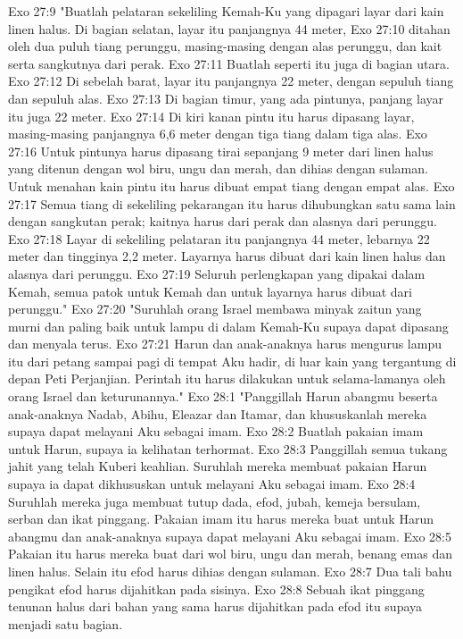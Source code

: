 Exo 27:9  "Buatlah pelataran sekeliling Kemah-Ku yang dipagari layar dari kain linen halus. Di bagian selatan, layar itu panjangnya 44 meter,
Exo 27:10  ditahan oleh dua puluh tiang perunggu, masing-masing dengan alas perunggu, dan kait serta sangkutnya dari perak.
Exo 27:11  Buatlah seperti itu juga di bagian utara.
Exo 27:12  Di sebelah barat, layar itu panjangnya 22 meter, dengan sepuluh tiang dan sepuluh alas.
Exo 27:13  Di bagian timur, yang ada pintunya, panjang layar itu juga 22 meter.
Exo 27:14  Di kiri kanan pintu itu harus dipasang layar, masing-masing panjangnya 6,6 meter dengan tiga tiang dalam tiga alas.
Exo 27:16  Untuk pintunya harus dipasang tirai sepanjang 9 meter dari linen halus yang ditenun dengan wol biru, ungu dan merah, dan dihias dengan sulaman. Untuk menahan kain pintu itu harus dibuat empat tiang dengan empat alas.
Exo 27:17  Semua tiang di sekeliling pekarangan itu harus dihubungkan satu sama lain dengan sangkutan perak; kaitnya harus dari perak dan alasnya dari perunggu.
Exo 27:18  Layar di sekeliling pelataran itu panjangnya 44 meter, lebarnya 22 meter dan tingginya 2,2 meter. Layarnya harus dibuat dari kain linen halus dan alasnya dari perunggu.
Exo 27:19  Seluruh perlengkapan yang dipakai dalam Kemah, semua patok untuk Kemah dan untuk layarnya harus dibuat dari perunggu."
Exo 27:20  "Suruhlah orang Israel membawa minyak zaitun yang murni dan paling baik untuk lampu di dalam Kemah-Ku supaya dapat dipasang dan menyala terus.
Exo 27:21  Harun dan anak-anaknya harus mengurus lampu itu dari petang sampai pagi di tempat Aku hadir, di luar kain yang tergantung di depan Peti Perjanjian. Perintah itu harus dilakukan untuk selama-lamanya oleh orang Israel dan keturunannya."
Exo 28:1  "Panggillah Harun abangmu beserta anak-anaknya Nadab, Abihu, Eleazar dan Itamar, dan khususkanlah mereka supaya dapat melayani Aku sebagai imam.
Exo 28:2  Buatlah pakaian imam untuk Harun, supaya ia kelihatan terhormat.
Exo 28:3  Panggillah semua tukang jahit yang telah Kuberi keahlian. Suruhlah mereka membuat pakaian Harun supaya ia dapat dikhususkan untuk melayani Aku sebagai imam.
Exo 28:4  Suruhlah mereka juga membuat tutup dada, efod, jubah, kemeja bersulam, serban dan ikat pinggang. Pakaian imam itu harus mereka buat untuk Harun abangmu dan anak-anaknya supaya dapat melayani Aku sebagai imam.
Exo 28:5  Pakaian itu harus mereka buat dari wol biru, ungu dan merah, benang emas dan linen halus. Selain itu efod harus dihias dengan sulaman.
Exo 28:7  Dua tali bahu pengikat efod harus dijahitkan pada sisinya.
Exo 28:8  Sebuah ikat pinggang tenunan halus dari bahan yang sama harus dijahitkan pada efod itu supaya menjadi satu bagian.
